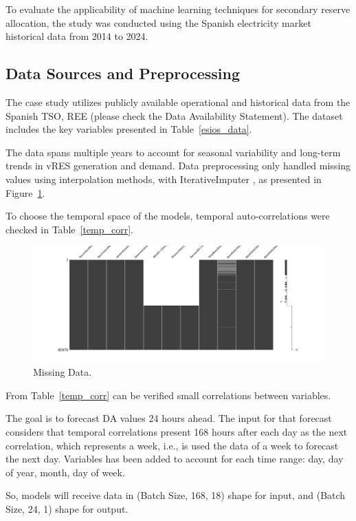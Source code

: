 To evaluate the applicability of machine learning techniques for secondary reserve allocation, the study was conducted using the Spanish electricity market historical data from 2014 to 2024.

\subsection{Data Sources and Preprocessing}

The case study utilizes publicly available operational and historical data from the Spanish \gls{TSO}, \gls{REE} (please check the Data Availability Statement). The dataset includes the key variables presented in Table~\ref{esios_data}.

The data spans multiple years to account for seasonal variability and long-term trends in vRES generation and demand. Data preprocessing only handled missing values using interpolation methods, with IterativeImputer \cite{vanBuuren2011,Buck1960}, as presented in Figure~\ref{fig:misisng_data}.

To choose the temporal space of the models, temporal auto-correlations were checked in Table~\ref{temp_corr}.

\begin{figure}[H]
    \centering
    \includegraphics[width=\textwidth]{plots/missing_data.png}
    \caption{Missing Data.}
    \label{fig:misisng_data}
  \end{figure}





From Table~\ref{temp_corr} can be verified small correlations between variables. 

The goal is to forecast \gls{DA} values 24 hours ahead. The input for that forecast considers that temporal correlations present 168 hours after each day as the next correlation, which represents a week, i.e., is used the data of a week to forecast the next day.
Variables has been added to account for each time range: day, day of year, month, day of week.\par
So, models will receive data in (Batch Size, 168, 18) shape for input, and (Batch Size, 24, 1) shape for output.

